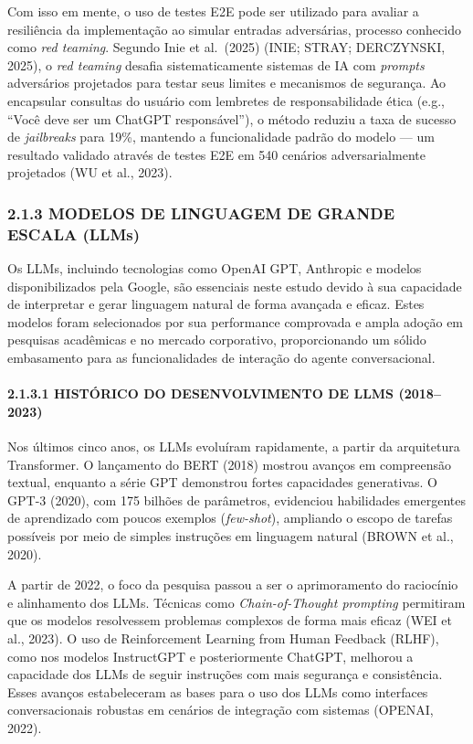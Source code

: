 \documentclass[
]{article}
\begin{document}
Com isso em mente, o uso de testes E2E pode ser utilizado para avaliar a
resiliência da implementação ao simular entradas adversárias, processo
conhecido como \emph{red teaming}. Segundo Inie et al.~(2025) (INIE;
STRAY; DERCZYNSKI, 2025), o \emph{red teaming} desafia sistematicamente
sistemas de IA com \emph{prompts} adversários projetados para testar
seus limites e mecanismos de segurança. Ao encapsular consultas do
usuário com lembretes de responsabilidade ética (e.g., ``Você deve ser
um ChatGPT responsável''), o método reduziu a taxa de sucesso de
\emph{jailbreaks} para 19\%, mantendo a funcionalidade padrão do modelo
--- um resultado validado através de testes E2E em 540 cenários
adversarialmente projetados (WU et al., 2023).

\subsubsection{2.1.3 MODELOS DE LINGUAGEM DE GRANDE ESCALA
(LLMs)}\label{modelos-de-linguagem-de-grande-escala-llms}

Os LLMs, incluindo tecnologias como OpenAI GPT, Anthropic e modelos
disponibilizados pela Google, são essenciais neste estudo devido à sua
capacidade de interpretar e gerar linguagem natural de forma avançada e
eficaz. Estes modelos foram selecionados por sua performance comprovada
e ampla adoção em pesquisas acadêmicas e no mercado corporativo,
proporcionando um sólido embasamento para as funcionalidades de
interação do agente conversacional.

\paragraph{2.1.3.1 HISTÓRICO DO DESENVOLVIMENTO DE LLMS
(2018--2023)}\label{histuxf3rico-do-desenvolvimento-de-llms-20182023}

Nos últimos cinco anos, os LLMs evoluíram rapidamente, a partir da
arquitetura Transformer. O lançamento do BERT (2018) mostrou avanços em
compreensão textual, enquanto a série GPT demonstrou fortes capacidades
generativas. O GPT-3 (2020), com 175 bilhões de parâmetros, evidenciou
habilidades emergentes de aprendizado com poucos exemplos
(\emph{few-shot}), ampliando o escopo de tarefas possíveis por meio de
simples instruções em linguagem natural (BROWN et al., 2020).

A partir de 2022, o foco da pesquisa passou a ser o aprimoramento do
raciocínio e alinhamento dos LLMs. Técnicas como \emph{Chain-of-Thought
prompting} permitiram que os modelos resolvessem problemas complexos de
forma mais eficaz (WEI et al., 2023). O uso de Reinforcement Learning
from Human Feedback (RLHF), como nos modelos InstructGPT e
posteriormente ChatGPT, melhorou a capacidade dos LLMs de seguir
instruções com mais segurança e consistência. Esses avanços
estabeleceram as bases para o uso dos LLMs como interfaces
conversacionais robustas em cenários de integração com sistemas (OPENAI,
2022).
\end{document}
